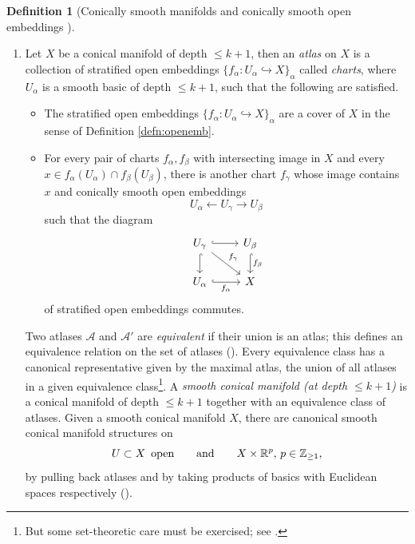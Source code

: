 \documentclass[10pt, reqno, twoside
, final
]{amsart}
\numberwithin{equation}{subsection}%
\theoremstyle{definition}
\newtheorem{defn}{Definition}[subsection]
\theoremstyle{definition}
\theoremstyle{definition}
\theoremstyle{definition}
\theoremstyle{definition}
\theoremstyle{definition}
\theoremstyle{definition}
\theoremstyle{definition}
\theoremstyle{definition}
\theoremstyle{plain}
\theoremstyle{definition}
\theoremstyle{plain}
\theoremstyle{definition}
\theoremstyle{plain}
\theoremstyle{definition}
\theoremstyle{definition}
\theoremstyle{plain}
\theoremstyle{plain}
\theoremstyle{definition}
\theoremstyle{plain}
\theoremstyle{plain}
\theoremstyle{plain}
\begin{document}
\begin{defn}[Conically smooth manifolds and conically smooth open embeddings \cite{AFT-local-structures}]
\begin{enumerate}[$(1)$]
\begin{enumerate}[$(i)$]
\begin{itemize}
            \[  f^{-1}(\R^j\times \R_{>0}\times Y)\longrightarrow \R^j\times \R_{>0}\times Y \]
            is a conically smooth open embedding, well defined by induction.
        \end{itemize}
   \end{enumerate}
    \item Let $X$ be a conical manifold of depth $\leq k+1$, then an \emph{atlas} on $X$ is a collection of stratified open embeddings $\{f_{\alpha}:U_{\alpha}\hookrightarrow X\}_{\alpha}$ called \emph{charts}, where $U_{\alpha}$ is a smooth basic of depth $\leq k+1$, such that the following are satisfied.
    \begin{itemize}
        \item The stratified open embeddings $\{f_{\alpha}:U_{\alpha}\hookrightarrow X\}_{\alpha}$ are a cover of $X$ in the sense of Definition \ref{defn:openemb}.
        \item For every pair of charts $f_{\alpha},f_{\beta}$ with intersecting image in $X$ and every $x\in f_{\alpha}(U_{\alpha})\cap f_{\beta}(U_{\beta})$, there is another chart $f_{\gamma}$ whose image contains $x$ and conically smooth open embeddings 
        \[  U_{\alpha} \longleftarrow  U_{\gamma} \longrightarrow  U_{\beta}\]
        such that the diagram 
        \[
        \begin{tikzcd}
            U_{\gamma}\ar[d,hook] \ar[r,hook] \ar[dr,"f_{\gamma}"] & U_{\beta} \ar[d,hook,"f_{\beta}"] \\
            U_{\alpha} \ar[r,hook,"f_{\alpha}"'] & X
        \end{tikzcd} 
        \]
        of stratified open embeddings commutes.
    \end{itemize}
    Two atlases $\mathcal{A}$ and $\mathcal{A}'$ are \emph{equivalent} if their union is an atlas; this defines an equivalence relation on the set of atlases (\cite[Lemma 3.2.11]{AFT-local-structures}). Every equivalence class has a canonical representative given by the maximal atlas, the union of all atlases in a given equivalence class\footnote{But some set-theoretic care must be exercised; see \cite[Footnote 9]{KSW}.}. A \emph{smooth conical manifold (at depth $\leq k+1$)} is a conical manifold of depth $\leq k+1$ together with an equivalence class of atlases. Given a smooth conical manifold $X$, there are canonical smooth conical manifold structures on 
    \[ U\subset X\,\text{ open}\qquad \text{and}\qquad X\times\mathbb{R}^p,\, p\in \mathbb{Z}_{\geq 1},\]
    by pulling back atlases and by taking products of basics with Euclidean spaces respectively (\cite[Definition 3.2.12, Definition 3.2.17]{AFT-local-structures}).

\end{enumerate}
\end{defn}
\end{document}
